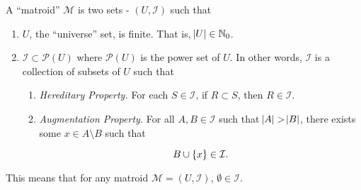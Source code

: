 \begin{define}
    A ``matroid'' $\mathcal{M}$ is two sets - $(U, \mathcal{I})$ such that 

    \begin{enumerate}
        \item $U$, the ``universe'' set, is finite. That is, $\abs{U} \in \mathbb{N}_0$. 
        \item $\mathcal{I} \subset \mathcal{P}(U)$ where $\mathcal{P}(U)$ is the power set of $U$. 
        In other words, $\mathcal{I}$ is a collection of subsets of $U$ such that 
        \begin{enumerate}
            \item \textit{Hereditary Property.} For each $S \in \mathcal{I}$, if $R \subset S$, then $R \in \mathcal{I}$.
            \item \textit{Augmentation Property.} For all $A, B \in \mathcal{I}$ such that $\abs{A} > \abs{B}$, there exists some $x \in A \setminus B$ such that 

            \[
                B \cup \cbr{x} \in \mathcal{I}. 
            \]
        \end{enumerate}
    \end{enumerate}
\end{define}

\begin{remark}
    This means that for any matroid $\mathcal{M}=(U,\mathcal{I})$, $\emptyset \in \mathcal{I}$. 
\end{remark}

